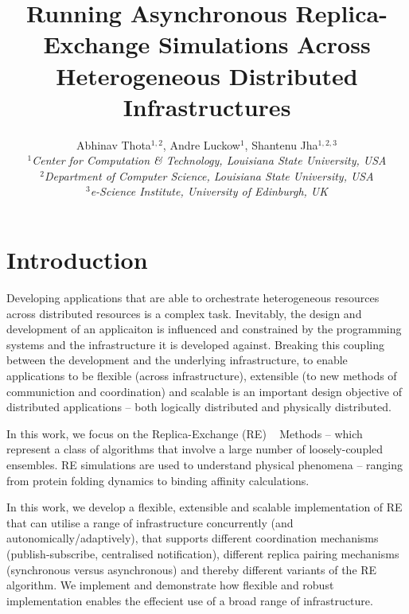 \documentclass[a4paper,10pt]{article}
\begin{document}
\title{\LARGE Running Asynchronous Replica-Exchange Simulations Across Heterogeneous Distributed Infrastructures}
 
\author{Abhinav Thota$^{1,2}$, Andre Luckow$^{1}$, Shantenu Jha$^{1,2,3}$\\
   \small{\emph{$^{1}$Center for Computation \& Technology, Louisiana State University, USA}}\\
   \small{\emph{$^{2}$Department of Computer Science, Louisiana State University, USA}}\\
   \small{\emph{$^{3}$e-Science Institute, University of Edinburgh, UK}}
   }
 
\maketitle

\section{Introduction}
 
Developing applications that are able to orchestrate heterogeneous
resources across distributed resources is a complex task.  Inevitably,
the design and development of an applicaiton is influenced and
constrained by the programming systems and the infrastructure it is
developed against. Breaking this coupling between the development and
the underlying infrastructure, to enable applications to be flexible
(across infrastructure), extensible (to new methods of communiction
and coordination) and scalable is an important design objective of
distributed applications -- both logically distributed and physically
distributed.

In this work, we focus on the Replica-Exchange (RE)
~\cite{hansmann,Sugita:1999rm} Methods -- which represent a class of
algorithms that involve a large number of loosely-coupled ensembles.
RE simulations are used to understand physical phenomena -- ranging
from protein folding dynamics to binding affinity calculations.

In this work, we develop a flexible, extensible and scalable
implementation of RE that can utilise a range of infrastructure
concurrently (and autonomically/adaptively), that supports different
coordination mechanisms (publish-subscribe, centralised notification),
different replica pairing mechanisms (synchronous versus asynchronous)
and thereby different variants of the RE algorithm. We implement and
demonstrate how flexible and robust implementation enables the
effecient use of a broad range of infrastructure.
\end{document}
